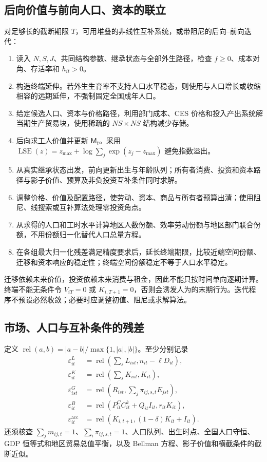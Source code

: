 \documentclass[UTF8,a4paper,zihao=-4,fontset=windows]{ctexart}
\numberwithin{equation}{section}
\newcommand{\pc}{P^{C}}
\newcommand{\invp}{Q}
\DeclareMathOperator{\LSE}{LSE}
\begin{document}
\subsection{后向价值与前向人口、资本的联立}
对足够长的截断期限 $T$，可用堆叠的非线性互补系统，或带阻尼的后向--前向迭代：
\begin{enumerate}
 \item 读入 $N,S,J$、共同结构参数、继承状态与全部外生路径，检查 $f\geq0$、成本对角、存活率和 $h_{it}>0$。
 \item 构造终端延伸。若外生生育率不支持人口水平稳态，则使用与人口增长或收缩相容的远期延伸，不强制固定全国成年人口。
 \item 给定候选人口、资本与价格路径，利用部门成本、CES 价格和投入产出系统解当期生产贸易块，使用稀疏的 $NS\times NS$ 结构减少存储。
 \item 后向求工人价值并更新 $\mathsf M_t$。采用 $\LSE(z)=z_{\max}+\log\sum_j\exp(z_j-z_{\max})$ 避免指数溢出。
 \item 从真实继承状态出发，前向更新出生与年龄队列；所有者消费、投资和资本路径与影子价值、预算及非负投资互补条件同时求解。
 \item 调整价格、价值及配置路径，使劳动、资本、商品与所有者预算出清；使用阻尼、线搜索或互补算法处理零投资角点。
 \item 从求得的人口和工时水平计算地区人数份额、效率劳动份额与地区部门联合份额，不用份额归一化替代人口总量方程。
 \item 在各组最大归一化残差满足精度要求后，延长终端期限，比较近端空间份额、迁移和资本响应的稳定性；终端空间份额稳定不等于人口水平稳定。
\end{enumerate}
迁移依赖未来价值，投资依赖未来消费与租金，因此不能只按时间单向逐期计算。终端不能无条件令 $V_{iT}=0$ 或 $K_{i,T+1}=0$，否则会诱发人为的末期行为。迭代程序不预设必然收敛；必要时应调整初值、阻尼或求解算法。

\subsection{市场、人口与互补条件的残差}
定义 $\operatorname{rel}(a,b)=|a-b|/\max\{1,|a|,|b|\}$。至少分别记录
\begin{align}
 \varepsilon^L_{it}&=\operatorname{rel}\left(\sum_sL_{ist},n_{it}-\ell D_{it}\right),\\
 \varepsilon^K_{it}&=\operatorname{rel}\left(\sum_sK_{ist},K_{it}\right),\\
 \varepsilon^G_{ist}&=\operatorname{rel}\left(R_{ist},\sum_j\pi_{ij,s,t}E_{jst}\right),\\
 \varepsilon^B_{it}&=\operatorname{rel}\left(\pc_{it}C^k_{it}+\invp_{it}I_{it},r_{it}K_{it}\right),\\
 \varepsilon^{\mathrm{acc}}_{it}&=\operatorname{rel}\left(K_{i,t+1},(1-\delta)K_{it}+I_{it}\right).
\end{align}
还须核查 $\sum_jm_{ij,t}=1$、$\sum_i\pi_{ij,s,t}=1$、人口队列、出生时点、全国人口守恒、GDP 恒等式和地区贸易总值平衡，以及 Bellman 方程、影子价值和横截条件的截断近似。
\end{document}
